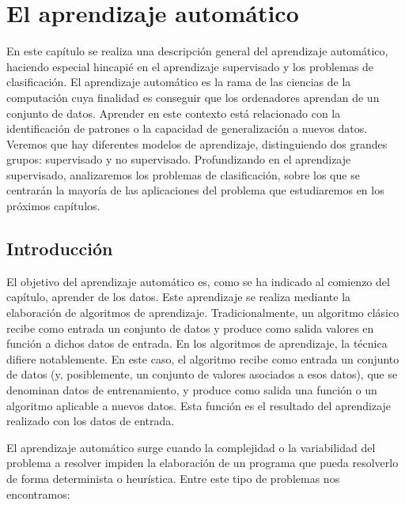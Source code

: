 \chapter{El aprendizaje automático} \label{chapter:machine_learning}

En este capítulo se realiza una descripción general del aprendizaje automático, haciendo especial hincapié en el aprendizaje supervisado y los problemas de clasificación. El aprendizaje automático es la rama de las ciencias de la computación cuya finalidad es conseguir que los ordenadores aprendan de un conjunto de datos. Aprender en este contexto está relacionado con la identificación de patrones o la capacidad de generalización a nuevos datos. Veremos que hay diferentes modelos de aprendizaje, distinguiendo dos grandes grupos: supervisado y no supervisado. Profundizando en el aprendizaje supervisado, analizaremos los problemas de clasificación, sobre los que se centrarán la mayoría de las aplicaciones del problema que estudiaremos en los próximos capítulos.

\section{Introducción}

El objetivo del aprendizaje automático es, como se ha indicado al comienzo del capítulo, aprender de los datos. Este aprendizaje se realiza mediante la elaboración de algoritmos de aprendizaje. Tradicionalmente, un algoritmo clásico recibe como entrada un conjunto de datos y produce como salida valores en función a dichos datos de entrada. En los algoritmos de aprendizaje, la técnica difiere notablemente. En este caso, el algoritmo recibe como entrada un conjunto de datos (y, posiblemente, un conjunto de valores asociados a esos datos), que se denominan datos de entrenamiento, y produce como salida una función o un algoritmo aplicable a nuevos datos. Esta función es el resultado del aprendizaje realizado con los datos de entrada.

El aprendizaje automático surge cuando la complejidad o la variabilidad del problema a resolver impiden la elaboración de un programa que pueda resolverlo de forma determinista o heurística. Entre este tipo de problemas nos encontramos:

